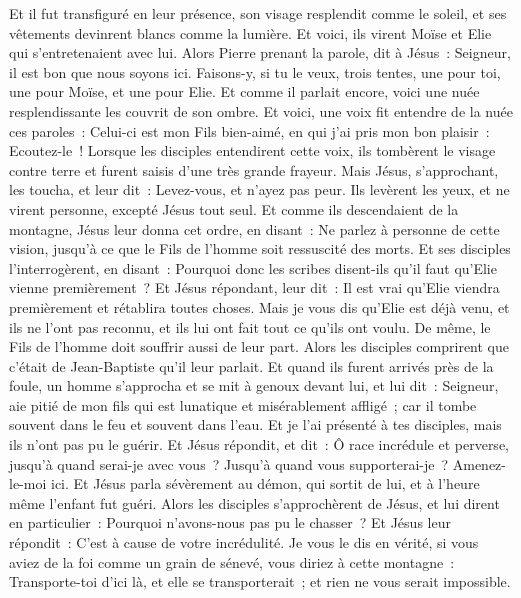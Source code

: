 \begin{multicols}{2}
Et il fut transfiguré en leur présence, son visage resplendit comme le soleil, et ses vêtements devinrent blancs comme la lumière.
Et voici, ils virent Moïse et Elie qui s'entretenaient avec lui.
Alors Pierre prenant la parole, dit à Jésus~: Seigneur, il est bon que nous soyons ici. Faisons-y, si tu le veux, trois tentes, une pour toi, une pour Moïse, et une pour Elie.
Et comme il parlait encore, voici une nuée resplendissante les couvrit de son ombre. Et voici, une voix fit entendre de la nuée ces paroles~: Celui-ci est mon Fils bien-aimé, en qui j'ai pris mon bon plaisir~: Ecoutez-le~!
Lorsque les disciples entendirent cette voix, ils tombèrent le visage contre terre et furent saisis d'une très grande frayeur.
Mais Jésus, s'approchant, les toucha, et leur dit~: Levez-vous, et n'ayez pas peur.
Ils levèrent les yeux, et ne virent personne, excepté Jésus tout seul.
Et comme ils descendaient de la montagne, Jésus leur donna cet ordre, en disant~: Ne parlez à personne de cette vision, jusqu'à ce que le Fils de l'homme soit ressuscité des morts.
Et ses disciples l'interrogèrent, en disant~: Pourquoi donc les scribes disent-ils qu'il faut qu'Elie vienne premièrement~?
Et Jésus répondant, leur dit~: Il est vrai qu'Elie viendra premièrement et rétablira toutes choses.
Mais je vous dis qu'Elie est déjà venu, et ils ne l'ont pas reconnu, et ils lui ont fait tout ce qu'ils ont voulu. De même, le Fils de l'homme doit souffrir aussi de leur part.
Alors les disciples comprirent que c'était de Jean-Baptiste qu'il leur parlait.
Et quand ils furent arrivés près de la foule, un homme s'approcha et se mit à genoux devant lui,
et lui dit~: Seigneur, aie pitié de mon fils qui est lunatique et misérablement affligé~; car il tombe souvent dans le feu et souvent dans l'eau.
Et je l'ai présenté à tes disciples, mais ils n'ont pas pu le guérir.
Et Jésus répondit, et dit~: Ô race incrédule et perverse, jusqu'à quand serai-je avec vous~? Jusqu'à quand vous supporterai-je~? Amenez-le-moi ici.
Et Jésus parla sévèrement au démon, qui sortit de lui, et à l'heure même l'enfant fut guéri.
Alors les disciples s'approchèrent de Jésus, et lui dirent en particulier~: Pourquoi n'avons-nous pas pu le chasser~?
Et Jésus leur répondit~: C'est à cause de votre incrédulité. Je vous le dis en vérité, si vous aviez de la foi comme un grain de sénevé, vous diriez à cette montagne~: Transporte-toi d'ici là, et elle se transporterait~; et rien ne vous serait impossible.

\end{multicols}
